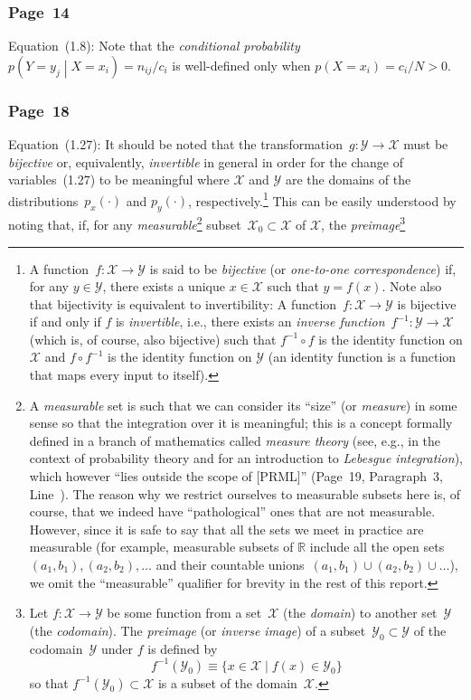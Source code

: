 \documentclass[12pt,a4paper]{article}
\newcommand{\erratum}[1]{%
\subsubsection*{#1}
\addcontentsline{toc}{subsection}{#1}}
\begin{document}
\erratum{Page~14}
Equation~(1.8):
Note that the \emph{conditional probability}~$p\left( Y = y_j \middle| X = x_i \right) =
n_{ij}/c_i$ is well-defined only when $p(X = x_i) = c_i/N > 0$.

\erratum{Page~18}
Equation~(1.27):
It should be noted that
the transformation~$g : \mathcal{Y} \to \mathcal{X}$ must be \emph{bijective} or, equivalently,
\emph{invertible} in general in order for the change of variables~(1.27) to be meaningful
where $\mathcal{X}$ and $\mathcal{Y}$ are the domains of
the distributions~$p_x(\cdot)$ and $p_y(\cdot)$, respectively.\footnote{%
A function~$f : \mathcal{X} \to \mathcal{Y}$ is said to be \emph{bijective}
(or \emph{one-to-one correspondence})
if, for any $y \in \mathcal{Y}$, there exists a unique $x \in \mathcal{X}$ such that $y = f(x)$.
Note also that bijectivity is equivalent to invertibility:
A function~$f : \mathcal{X} \to \mathcal{Y}$ is bijective if and only if $f$ is \emph{invertible},
i.e., there exists an \emph{inverse function}~$f^{-1} : \mathcal{Y} \to \mathcal{X}$
(which is, of course, also bijective)
such that $f^{-1} \circ f$ is the identity function on $\mathcal{X}$
and $f \circ f^{-1}$ is the identity function on $\mathcal{Y}$
(an identity function is a function that maps every input to itself).}
This can be easily understood by noting that,
if, for any \emph{measurable}\footnote{%
A \emph{measurable} set is such that
we can consider its ``size'' (or \emph{measure}) in some sense
so that the integration over it is meaningful;
this is a concept formally defined in a branch of mathematics called \emph{measure theory}
(see, e.g., \citet{Feller:ProbabilityTheory2} in the context of probability theory
and \citet{Tao:MeasureTheory} for an introduction to \emph{Lebesgue integration}),
which however ``lies outside the scope of [PRML]'' (Page~19, Paragraph~3, Line~).
The reason why we restrict ourselves to measurable subsets here is, of course, that
we indeed have ``pathological'' ones that are not measurable.
However, since it is safe to say that all the sets we meet in practice are measurable
(for example, measurable subsets of $\mathbb{R}$ include
all the open sets~$(a_1, b_1), (a_2, b_2), \dots$ and
their countable unions~$(a_1, b_1) \cup (a_2, b_2) \cup \dots$),
we omit the ``measurable'' qualifier for brevity in the rest of this report.}
subset~$\mathcal{X}_0 \subset \mathcal{X}$ of $\mathcal{X}$,
the \emph{preimage}\footnote{%
Let $f : \mathcal{X} \to \mathcal{Y}$ be some function
from a set~$\mathcal{X}$ (the \emph{domain})
to another set~$\mathcal{Y}$ (the \emph{codomain}).
The \emph{preimage} (or \emph{inverse image}) of
a subset~$\mathcal{Y}_0 \subset \mathcal{Y}$ of the codomain~$\mathcal{Y}$
under $f$ is defined by
\begin{equation}
f^{-1}(\mathcal{Y}_0) \equiv \{ x \in \mathcal{X} \mid f(x) \in \mathcal{Y}_0 \}
\end{equation}
so that $f^{-1}(\mathcal{Y}_0) \subset \mathcal{X}$ is a subset of the domain~$\mathcal{X}$.}~%
\end{document}
